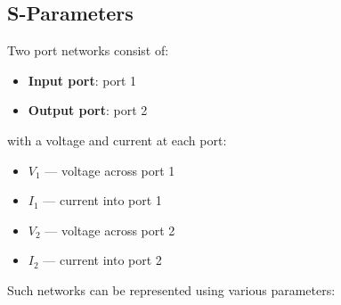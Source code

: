 \documentclass{article}
\begin{document}
\subsection{S-Parameters}
Two port networks consist of:
\begin{itemize}
    \item \textbf{Input port}: port 1
    \item \textbf{Output port}: port 2
\end{itemize}
with a voltage and current at each port:
\begin{itemize}
    \item \(V_1\) --- voltage across port 1
    \item \(I_1\) --- current into port 1
    \item \(V_2\) --- voltage across port 2
    \item \(I_2\) --- current into port 2
\end{itemize}
Such networks can be represented using various parameters:
\end{document}
